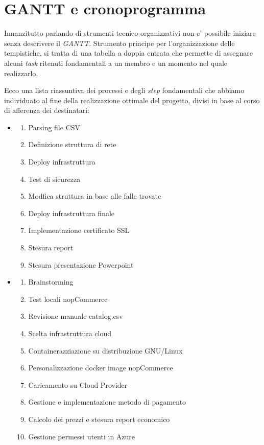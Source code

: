 \documentclass[a4paper]{report}
\begin{document}
	\section{GANTT e cronoprogramma}\label{gantt_e_cronoprogramma}
		Innanzitutto parlando di strumenti tecnico-organizzativi non e' possibile iniziare senza descrivere il
		\emph{GANTT}.  Strumento principe per l'organizzazione delle tempistiche, si tratta di una tabella a doppia
		entrata che permette di assegnare alcuni \emph{task} ritenuti fondamentali a un membro e un momento nel quale
		realizzarlo.

		Ecco una lista riassuntiva dei processi e degli \emph{step} fondamentali che abbiamo individuato al fine della
		realizzazione ottimale del progetto, divisi in base al corso di afferenza dei destinatari:
		\begin{itemize}
			\item \begin{enumerate}
					\item Parsing file CSV
					\item Definizione struttura di rete
					\item Deploy infrastruttura
					\item Test di sicurezza
					\item Modfica struttura in base alle falle trovate
					\item Deploy infrastruttura finale
					\item Implementazione certificato SSL
					\item Stesura report
					\item Stesura presentazione Powerpoint
				\end{enumerate}
			\item \begin{enumerate}
					\item Brainstorming
					\item Test locali nopCommerce
					\item Revisione manuale catalog.csv
					\item Scelta infrastruttura cloud
					\item Containerazziazione su distribuzione GNU/Linux
					\item Personalizzazione docker image nopCommerce
					\item Caricamento su Cloud Provider
					\item Gestione e implementazione metodo di pagamento
					\item Calcolo dei prezzi e stesura report economico
					\item Gestione permessi utenti in Azure
				\end{enumerate}
		\end{itemize}
\end{document}
